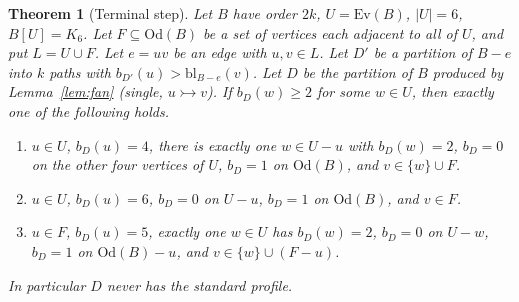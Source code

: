 \documentclass[11pt]{amsart}
\newtheorem{theorem}{Theorem}[section]
\theoremstyle{definition}
\newcommand{\Ev}{\mathrm{Ev}}
\newcommand{\Od}{\mathrm{Od}}
\newcommand{\tr}{\rightarrowtail}   %
\newcommand{\bl}{\mathrm{bl}}
\begin{document}
\begin{theorem}[Terminal step]\label{thm:terminal}
Let $B$ have order $2k$, $U=\Ev(B)$, $|U|=6$, $B[U]=K_6$. Let $F\subseteq\Od(B)$ be a set of
vertices each adjacent to all of $U$, and put $L=U\cup F$. Let $e=uv$ be an edge with $u,v\in L$.
Let $D'$ be a partition of $B-e$ into $k$ paths with
$b_{D'}(u)>\bl_{B-e}(v)$. Let $D$ be the partition of $B$ produced by Lemma~\ref{lem:fan}
(single, $u\tr v$). If $b_D(w)\ge2$ for some $w\in U$, then exactly one of the following holds.
\begin{enumerate}[label=($\alpha$)]
\item[($\alpha$)] $u\in U$, $b_D(u)=4$, there is exactly one $w\in U-u$ with $b_D(w)=2$, $b_D=0$ on
the other four vertices of $U$, $b_D=1$ on $\Od(B)$, and $v\in\{w\}\cup F$.
\item[($\beta$)] $u\in U$, $b_D(u)=6$, $b_D=0$ on $U-u$, $b_D=1$ on $\Od(B)$, and $v\in F$.
\item[($\gamma$)] $u\in F$, $b_D(u)=5$, exactly one $w\in U$ has $b_D(w)=2$, $b_D=0$ on $U-w$,
$b_D=1$ on $\Od(B)-u$, and $v\in\{w\}\cup(F-u)$.
\end{enumerate}
In particular $D$ never has the standard profile.
\end{theorem}
\end{document}
